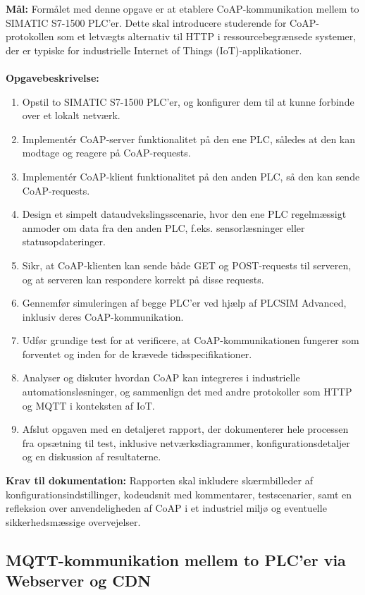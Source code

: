 \textbf{Mål:} Formålet med denne opgave er at etablere CoAP-kommunikation mellem to SIMATIC S7-1500 PLC'er. Dette skal introducere studerende for CoAP-protokollen som et letvægts alternativ til HTTP i ressourcebegrænsede systemer, der er typiske for industrielle Internet of Things (IoT)-applikationer.
\\\\
\noindent\textbf{Opgavebeskrivelse:}
\begin{enumerate}
	\item Opstil to SIMATIC S7-1500 PLC'er, og konfigurer dem til at kunne forbinde over et lokalt netværk.
	\item Implementér CoAP-server funktionalitet på den ene PLC, således at den kan modtage og reagere på CoAP-requests.
	\item Implementér CoAP-klient funktionalitet på den anden PLC, så den kan sende CoAP-requests.
	\item Design et simpelt dataudvekslingsscenarie, hvor den ene PLC regelmæssigt anmoder om data fra den anden PLC, f.eks. sensorlæsninger eller statusopdateringer.
	\item Sikr, at CoAP-klienten kan sende både GET og POST-requests til serveren, og at serveren kan respondere korrekt på disse requests.
	\item Gennemfør simuleringen af begge PLC'er ved hjælp af PLCSIM Advanced, inklusiv deres CoAP-kommunikation.
	\item Udfør grundige test for at verificere, at CoAP-kommunikationen fungerer som forventet og inden for de krævede tidsspecifikationer.
	\item Analyser og diskuter hvordan CoAP kan integreres i industrielle automationsløsninger, og sammenlign det med andre protokoller som HTTP og MQTT i konteksten af IoT.
	\item Afslut opgaven med en detaljeret rapport, der dokumenterer hele processen fra opsætning til test, inklusive netværksdiagrammer, konfigurationsdetaljer og en diskussion af resultaterne.
\end{enumerate}	
\textbf{Krav til dokumentation:} Rapporten skal inkludere skærmbilleder af konfigurationsindstillinger, kodeudsnit med kommentarer, testscenarier, samt en refleksion over anvendeligheden af CoAP i et industriel miljø og eventuelle sikkerhedsmæssige overvejelser.

\subsection*{MQTT-kommunikation mellem to PLC'er via Webserver og CDN}
\label{subsec:mqtt_communication_plc_CDN}

